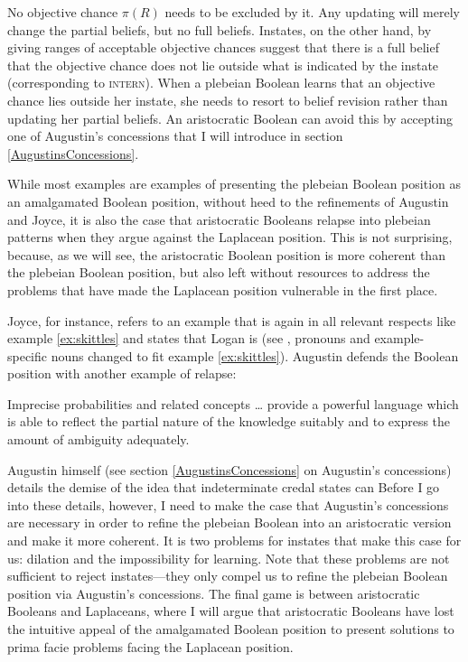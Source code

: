 \documentclass[12pt]{article}
\begin{document}
No objective chance $\pi(R)$ needs to be excluded by it. Any updating
will merely change the partial beliefs, but no full beliefs. Instates,
on the other hand, by giving ranges of acceptable objective chances
suggest that there is a full belief that the objective chance does not
lie outside what is indicated by the instate (corresponding to
\textsc{intern}). When a plebeian Boolean learns that an objective
chance lies outside her instate, she needs to resort to belief
revision rather than updating her partial beliefs. An aristocratic
Boolean can avoid this by accepting one of Augustin's concessions that
I will introduce in section \ref{AugustinsConcessions}.

While most examples are examples of presenting the plebeian Boolean
position as an amalgamated Boolean position, without heed to the
refinements of Augustin and Joyce, it is also the case that
aristocratic Booleans relapse into plebeian patterns when they argue
against the Laplacean position. This is not surprising, because, as we
will see, the aristocratic Boolean position is more coherent than the
plebeian Boolean position, but also left without resources to address
the problems that have made the Laplacean position vulnerable in the
first place.

Joyce, for instance, refers to an example that is again in all
relevant respects like example \ref{ex:skittles} and states that Logan
is  (see ,
pronouns and example-specific nouns changed to fit example
\ref{ex:skittles}). Augustin defends the Boolean position with another
example of relapse:

\begin{quotex}
  Imprecise probabilities and related concepts {\ldots} provide a
  powerful language which is able to reflect the partial nature of the
  knowledge suitably and to express the amount of ambiguity
  adequately. 
\end{quotex}

Augustin himself (see section \ref{AugustinsConcessions} on Augustin's
concessions) details the demise of the idea that indeterminate credal
states can  Before
I go into these details, however, I need to make the case that
Augustin's concessions are necessary in order to refine the plebeian
Boolean into an aristocratic version and make it more coherent. It is
two problems for instates that make this case for us: dilation and the
impossibility for learning. Note that these problems are not
sufficient to reject instates---they only compel us to refine the
plebeian Boolean position via Augustin's concessions. The final game
is between aristocratic Booleans and Laplaceans, where I will argue
that aristocratic Booleans have lost the intuitive appeal of the
amalgamated Boolean position to present solutions to prima facie
problems facing the Laplacean position.
\end{document}
